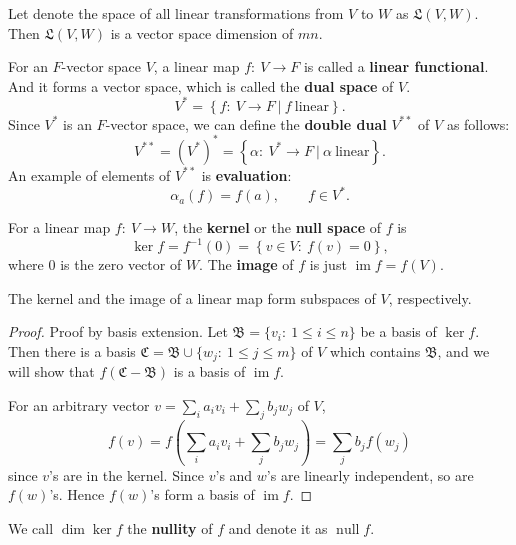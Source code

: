 \begin{prop}
Let denote the space of all linear transformations from $V$ to $W$ as $\mathfrak L(V,W)$. Then $\mathfrak L(V,W)$ is a vector space dimension of $mn$.
\end{prop}


\begin{defn}
For an $F$-vector space $V$, a linear map $f:~V\to F$ is called a \textbf{linear functional}. And it forms a vector space, which is called the \textbf{dual space} of $V$. $$V^{*} = \left\{ f:~V\to F~|~ f~\textrm{linear}\right\}.$$ Since $V^*$ is an $F$-vector space, we can define the \textbf{double dual} $V^{**}$ of $V$ as follows: $$V^{**} = (V^*)^* = \left\{ \alpha:~V^*\to F~|~ \alpha~\textrm{linear}\right\}.$$
An example of elements of $V^{**}$ is \textbf{evaluation}: $$\alpha_a(f) = f(a),\qquad f\in V^*.$$
\end{defn}

\begin{defn}
For a linear map $f:~V\to W$, the \textbf{kernel} or the \textbf{null space} of $f$ is $$\ker  f = f^{-1}(0) = \left\{v\in V: ~ f(v) = 0 \right\},$$ where $0$ is the zero vector of $W.$ The \textbf{image} of $f$ is just $\operatorname{im}f = f(V).$
\end{defn}
\begin{prop}
The kernel and the image of a linear map form subspaces of $V$, respectively.
\end{prop}
\begin{proof}
Proof by basis extension. Let $\mathfrak B=\{v_i:~1\le i \le n\}$ be a basis of $\ker f.$ Then there is a basis $\mathfrak C = \mathfrak B \cup \{w_j:~1\le j \le m\}$ of $V$ which contains $\mathfrak B$, and we will show that $f(\mathfrak C - \mathfrak B)$ is a basis of $\operatorname{im}f$.

For an arbitrary vector $v = \sum_{i} a_i v_i + \sum_j b_j w_j$ of $V$, $$f(v) = f\left(\sum_i a_i v_i + \sum_j b_j w_j \right) = \sum_j b_j f(w_j)$$ since $v$'s are in the kernel. Since $v$'s and $w$'s are linearly independent, so are $f(w)$'s. Hence $f(w)$'s form a basis of $\operatorname{im}f$.
\end{proof}
We call $\operatorname{dim}\ker f$ the \textbf{nullity} of $f$ and denote it as $\operatorname{null}f$.

